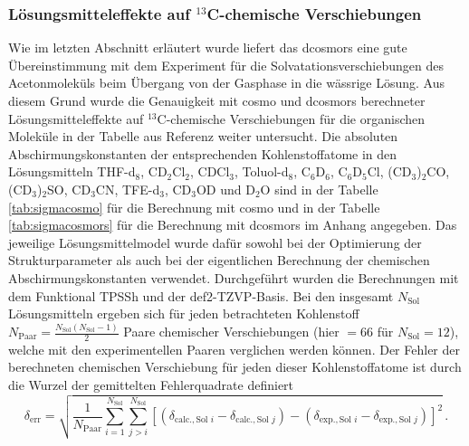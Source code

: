 	\subsubsection{Lösungsmitteleffekte auf \texorpdfstring{$^{13}$C}{13C}-chemische Verschiebungen}
	Wie im letzten Abschnitt erläutert wurde liefert das \ac{dcosmors} eine gute Übereinstimmung mit dem Experiment für die Solvatationsverschiebungen des Acetonmoleküls beim Übergang von der Gasphase in die wässrige Lösung. Aus diesem Grund wurde die Genauigkeit mit \ac{cosmo} und \ac{dcosmors} berechneter Lösungsmitteleffekte auf $^{13}$C-chemische Verschiebungen für die organischen Moleküle in der Tabelle aus Referenz \cite{fulmer2010nmr} weiter untersucht. Die absoluten Abschirmungskonstanten der entsprechenden Kohlenstoffatome in den Lösungsmitteln THF-d$_{8}$, CD$_{2}$Cl$_{2}$, CDCl$_{3}$, Toluol-d$_{8}$, C$_{6}$D$_{6}$, C$_{6}$D$_{5}$Cl, (CD$_{3}$)$_{2}$CO, (CD$_{3}$)$_{2}$SO, CD$_{3}$CN, TFE-d$_{3}$, CD$_{3}$OD und D$_{2}$O sind in der Tabelle \ref{tab:sigmacosmo} für die Berechnung mit \ac{cosmo} und in der Tabelle \ref{tab:sigmacosmors} für die Berechnung mit \ac{dcosmors} im Anhang angegeben. Das jeweilige Lösungsmittelmodel wurde dafür sowohl bei der Optimierung der Strukturparameter als auch bei der eigentlichen Berechnung der chemischen Abschirmungskonstanten verwendet. Durchgeführt wurden die Berechnungen mit dem Funktional TPSSh\supercite{staroverov2003comparative} und der def2-TZVP-Basis\supercite{weigend2005balanced}. Bei den insgesamt $N_{\textrm{Sol}}$ Lösungsmitteln ergeben sich für jeden betrachteten Kohlenstoff $N_{\textrm{Paar}}=\frac{N_{\textrm{Sol}}(N_{\textrm{Sol}}-1)}{2}$ Paare chemischer Verschiebungen (hier $=66$ für $N_{\textrm{Sol}}=12$), welche mit den experimentellen Paaren verglichen werden können. Der Fehler der berechneten chemischen Verschiebung für jeden dieser Kohlenstoffatome ist durch die Wurzel der gemittelten Fehlerquadrate definiert
	\begin{equation}
	\delta_{\textrm{err}}=\sqrt{\frac{1}{N_{\textrm{Paar}}}\sum_{i=1}^{N_{\textrm{Sol}}}\sum_{j>i}^{N_{\textrm{Sol}}}\left[\left(\delta_{\textrm{calc.},{\textrm{Sol }i}}-\delta_{\textrm{calc.},{\textrm{Sol }j}}\right)-\left(\delta_{\textrm{exp.},{\textrm{Sol }i}}-\delta_{\textrm{exp.},{\textrm{Sol }j}}\right)\right]^2}\, .
	\end{equation}

